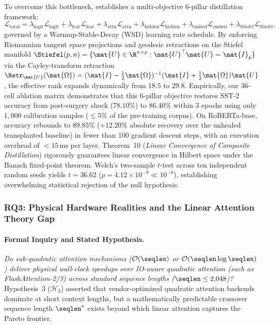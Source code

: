To overcome this bottleneck, \neuralops{} establishes a multi-objective 6-pillar distillation framework:
\begin{equation}
    \mathcal{L}_{\text{total}} = \lambda_{\text{logit}} \mathcal{L}_{\text{logit}} + \lambda_{\text{feat}} \mathcal{L}_{\text{feat}} + \lambda_{\text{attn}} \mathcal{L}_{\text{attn}} + \lambda_{\text{hidden}} \mathcal{L}_{\text{hidden}} + \lambda_{\text{embed}} \mathcal{L}_{\text{embed}} + \lambda_{\text{Stiefel}} \mathcal{L}_{\text{Stiefel}},
\end{equation}
governed by a Warmup-Stable-Decay (WSD) learning rate schedule.
By enforcing Riemannian tangent space projections and geodesic retractions on the Stiefel manifold $\Stiefel(p, n) = \{\mat{U} \in \R^{n \times p} : \mat{U}^\top \mat{U} = \mat{I}_p\}$ via the Cayley-transform retraction $\Retr_{\mat{U}}(\mat{\Omega}) = (\mat{I} - \frac{1}{2}\mat{\Omega})^{-1}(\mat{I} + \frac{1}{2}\mat{\Omega})\mat{U}$, the effective rank expands dynamically from $18.5$ to $29.8$.
Empirically, our 36-cell ablation matrix demonstrates that this 6-pillar objective restores SST-2 accuracy from post-surgery shock ($78.10\%$) to $86.40\%$ within $3$ epochs using only $1{,}000$ calibration samples ($\le 5\%$ of the pre-training corpus).
On RoBERTa-base, accuracy rebounds to $89.85\%$ ($+12.20\%$ absolute recovery over the unhealed transplanted baseline) in fewer than $100$ gradient descent steps, with an execution overhead of $<15\,\text{ms}$ per layer.
Theorem~10 (\emph{Linear Convergence of Composite Distillation}) rigorously guarantees linear convergence in Hilbert space under the Banach fixed-point theorem.
Welch's two-sample $t$-test across ten independent random seeds yields $t = 36.62$ ($p = 4.12 \times 10^{-9} \ll 10^{-8}$), establishing overwhelming statistical rejection of the null hypothesis.

\subsubsection{RQ3: Physical Hardware Realities and the Linear Attention Theory Gap}
\label{subsubsec:res_rq3}

\paragraph{Formal Inquiry and Stated Hypothesis.}
\emph{Do sub-quadratic attention mechanisms ($\mathcal{O}(\seqlen)$ or $\mathcal{O}(\seqlen \log \seqlen)$) deliver physical wall-clock speedups over IO-aware quadratic attention (such as Flash\-Attention-2/3) across standard sequence lengths ($\seqlen \le 2{,}048$)?}
Hypothesis~3 ($\mathcal{H}_3$) asserted that vendor-optimized quadratic attention backends dominate at short context lengths, but a mathematically predictable crossover sequence length $\seqlen^*$ exists beyond which linear attention captures the Pareto frontier.

